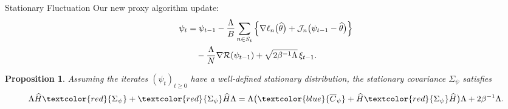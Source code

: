 \documentclass[10pt,xcolor=table]{beamer}
\newtheorem{proposition}{Proposition}
\begin{document}
\begin{frame}{Stationary Fluctuation}
Our new proxy algorithm update:
\begin{equation*}
	\begin{aligned}
		\psi_{t} &= \psi_{t-1} -\frac{\Lambda}{B} \sum_{n \in S_{t}} \left\lbrace \nabla \ell_{n}\big(\widehat{\theta}\big) +\mathcal{J}_{n} \big(\psi_{t-1}-\widehat{\theta}\big)\right\rbrace \\
		&\quad - \frac{\Lambda}{N} \nabla \mathcal{R}(\psi_{t-1}) + \sqrt{2\beta^{-1} \Lambda}\,\xi_{t-1}.
	\end{aligned}
	\label{eq: proxy discrete-time update for general loss}
\end{equation*}
	\begin{proposition} \label{thm:SGLD-stationary-covariance} 
		Assuming the iterates $(\psi_{t})_{t \ge 0}$ have a well-defined stationary distribution, the stationary covariance $\Sigma_{\psi}$ satisfies 
		\begin{equation*}
			\Lambda \hess \textcolor{red}{\Sigma_{\psi}} + \textcolor{red}{\Sigma_{\psi}}  \hess \Lambda = \Lambda \big( \textcolor{blue}{\overline{C}_{\psi}} + \hess \textcolor{red}{\Sigma_{\psi}} \hess \big)\Lambda + 2\beta^{-1}\Lambda.
			\label{eq: SGLD stationary covariance}
		\end{equation*}
	\end{proposition}
	
\end{frame}
\end{document}
